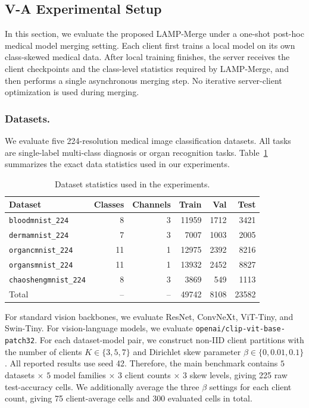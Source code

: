 \subsection{V-A Experimental Setup}
In this section, we evaluate the proposed LAMP-Merge under a one-shot post-hoc medical model merging setting. Each client first trains a local model on its own class-skewed medical data. After local training finishes, the server receives the client checkpoints and the class-level statistics required by LAMP-Merge, and then performs a single asynchronous merging step. No iterative server-client optimization is used during merging.

\subsubsection{Datasets.}
We evaluate five 224-resolution medical image classification datasets. All tasks are single-label multi-class diagnosis or organ recognition tasks. Table~\ref{tab:dataset-stats} summarizes the exact data statistics used in our experiments.

\begin{table}[t]
\centering
\caption{Dataset statistics used in the experiments.}
\label{tab:dataset-stats}
\small
\begin{tabular}{lrrrrr}
\hline
Dataset & Classes & Channels & Train & Val & Test \\
\hline
\texttt{bloodmnist\_224} & 8 & 3 & 11959 & 1712 & 3421 \\
\texttt{dermamnist\_224} & 7 & 3 & 7007 & 1003 & 2005 \\
\texttt{organcmnist\_224} & 11 & 1 & 12975 & 2392 & 8216 \\
\texttt{organsmnist\_224} & 11 & 1 & 13932 & 2452 & 8827 \\
\texttt{chaoshengmnist\_224} & 8 & 3 & 3869 & 549 & 1113 \\
\hline
Total & -- & -- & 49742 & 8108 & 23582 \\
\hline
\end{tabular}
\end{table}

For standard vision backbones, we evaluate ResNet, ConvNeXt, ViT-Tiny, and Swin-Tiny. For vision-language models, we evaluate \texttt{openai/clip-vit-base-patch32}. For each dataset-model pair, we construct non-IID client partitions with the number of clients $K\in\{3,5,7\}$ and Dirichlet skew parameter $\beta\in\{0,0.01,0.1\}$. All reported results use seed 42. Therefore, the main benchmark contains $5$ datasets $\times$ $5$ model families $\times$ $3$ client counts $\times$ $3$ skew levels, giving 225 raw test-accuracy cells. We additionally average the three $\beta$ settings for each client count, giving 75 client-average cells and 300 evaluated cells in total.

